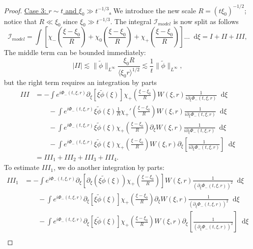 \documentclass[11 pt]{amsart}
\theoremstyle{definition}
\theoremstyle{remark}
\numberwithin{equation}{section}
\newcommand{\dd}{\mathop{}\!\mathrm{d}}
\begin{document}
\begin{proof}
\noindent \underline{Case 3: $r \sim t$ and $\xi_0 \gg t^{-1/3}$.}
We introduce the new scale $R = (t \xi_0)^{-1/2}$; notice that $R \ll \xi_0$ since $\xi_0 \gg t^{-1/3}$. The integral $\mathcal{I}_{model}$ is now split as follows
$$
\mathcal{I}_{model} = \int \left[ \chi_-\left( \frac{\xi - \xi_0}{R} \right) + \chi_0\left( \frac{\xi - \xi_0}{R} \right) + \chi_+\left( \frac{\xi - \xi_0}{R} \right)\right] \dots \dd \xi = I + II + III,
$$
The middle term can be bounded immediately:
$$
|II| \lesssim  \| \widetilde{\phi} \|_{L^\infty} \frac{\xi_0 R}{\langle \xi_0 r \rangle^{1/2}} \lesssim \frac 1t  \| \widetilde{\phi} \|_{L^\infty}, 
$$
but the right term requires an integration by parts
\begin{align*}
III & = - \int e^{i \Phi_-(t,\xi,r)} \partial_\xi \left[ \xi \widetilde{\phi}(\xi)\right] \chi_+\left( \frac{\xi - \xi_0}{R} \right) W(\xi,r) \frac{1}{i \partial_\xi \Phi_-(t,\xi,r)} \dd \xi \\
&\qquad - \int e^{i \Phi_-(t,\xi,r)} \xi \widetilde{\phi}(\xi) \frac{1}{R} \chi_+'\left( \frac{\xi - \xi_0}{R} \right) W(\xi,r) \frac{1}{i \partial_\xi \Phi_-(t,\xi,r)} \dd \xi \\
& \qquad -  \int e^{i \Phi_-(t,\xi,r)} \xi \widetilde{\phi}(\xi)  \chi_+\left( \frac{\xi - \xi_0}{R} \right) \partial_\xi W(\xi,r)  \frac{1}{i \partial_\xi \Phi_-(t,\xi,r)} \dd \xi \\
& \qquad -  \int e^{i \Phi_-(t,\xi,r)} \xi \widetilde{\phi}(\xi) \chi_+\left( \frac{\xi - \xi_0}{R} \right) W(\xi,r)  \partial_\xi \left[ \frac{1}{i \partial_\xi \Phi_-(t,\xi,r)} \right] \dd \xi \\
& = III_1 + III_2+ III_3 + III_4.
\end{align*}
To estimate $III_1$, we do another integration by parts:
\begin{align*}
III_1 & = - \int e^{i \Phi_-(t,\xi,r)} \partial_\xi \left[ \partial_\xi (\xi \widetilde{\phi}(\xi)) \chi_+\left( \frac{\xi - \xi_0}{R} \right) \right] W(\xi,r) \frac{1}{(\partial_\xi \Phi_-(t,\xi,r))^2} \dd \xi \\
& \qquad -  \int e^{i \Phi_-(t,\xi,r)} \partial_\xi\left[\xi \widetilde{\phi}(\xi) \right] \chi_+\left( \frac{\xi - \xi_0}{R} \right) \partial_\xi W(\xi,r)  \frac{1}{(\partial_\xi \Phi_-(t,\xi,r))^2} \dd \xi \\
& \qquad -  \int e^{i \Phi_-(t,\xi,r)}  \partial_\xi\left[ \xi \widetilde{\phi}(\xi)\right] \chi_+\left( \frac{\xi - \xi_0}{R} \right) W(\xi,r)  \partial_\xi \left[ \frac{1}{(\partial_\xi \Phi_-(t,\xi,r))^2} \right] \dd \xi \\

\end{align*}
\end{proof}
\end{document}
